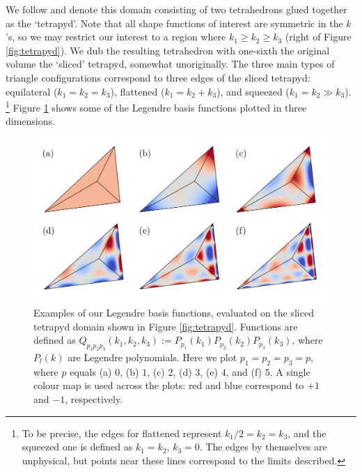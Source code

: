 We follow \cite{Fergusson2010general} and denote this domain consisting of two tetrahedrons glued together as the `tetrapyd'. Note that all shape functions of interest are symmetric in the $k$'s, so we may restrict our interest to a region where $k_1 \ge k_2 \ge k_3$ (right of Figure \ref{fig:tetrapyd}). We dub the resulting tetrahedron with one-sixth the original volume the `sliced' tetrapyd, somewhat unoriginally. The three main types of triangle configurations correspond to three edges of the sliced tetrapyd: equilateral ($k_1=k_2=k_3$), flattened ($k_1 = k_2 + k_3$), and squeezed ($k_1 = k_2 \gg k_3$). \footnote{To be precise, the edges for flattened represent $k_1/2 = k_2 = k_3$, and the squeezed one is defined as $k_1=k_2$, $k_3=0$. The edges by themselves are unphysical, but points near these lines correspond to the limits described.} Figure \ref{fig:Legendre_basis_functions_3D} shows some of the Legendre basis functions plotted in three dimensions.

\begin{figure}
	\centering    
	\includegraphics[width=1.0\textwidth]{legendre_modes_3D_final.pdf}
	\caption{Examples of our Legendre basis functions, evaluated on the sliced tetrapyd domain shown in Figure \ref{fig:tetrapyd}. Functions are defined as $Q_{p_1 p_2 p_3}(k_1,k_2,k_3) := P_{p_1}(k_1) P_{p_2}(k_2) P_{p_3}(k_3)$, where $P_l(k)$ are Legendre polynomials. Here we plot $p_1 = p_2 = p_3 = p$, where $p$ equals (a) $0$, (b) $1$, (c) $2$, (d) $3$, (e) $4$, and (f) $5$. A single colour map is used across the plots: red and blue correspond to $+1$ and $-1$, respectively.}	
	\label{fig:Legendre_basis_functions_3D}
\end{figure}

